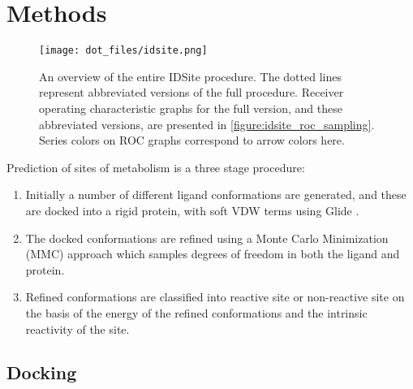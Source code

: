 \section{Methods}
\label{section:p450/methods}

\begin{figure}[h!]
\centering
\texttt{[image: dot\_files/idsite.png]}
\caption{An overview of the entire IDSite procedure.
The dotted lines represent abbreviated versions of the full procedure.
Receiver operating characteristic graphs for the full version, and these abbreviated versions, are presented in \ref{figure:idsite_roc_sampling}.
Series colors on ROC graphs correspond to arrow colors here.}
\label{figure:idsite_overview}
\end{figure}

Prediction of sites of metabolism is a three stage procedure:
\begin{enumerate}
\item Initially a number of different ligand conformations are generated, and these are docked into a rigid protein, with soft VDW terms using Glide \cite{halgren2004glide,friesner2004glide}.
\item The docked conformations are refined using a Monte Carlo Minimization (MMC) approach which samples degrees of freedom in both the ligand and protein.
\item Refined conformations are classified into reactive site or non-reactive site on the basis of the energy of the refined conformations and the intrinsic reactivity of the site. \cite{li2011idsite}
\end{enumerate}

\subsection{Docking}
\label{subsection:p450/docking}


